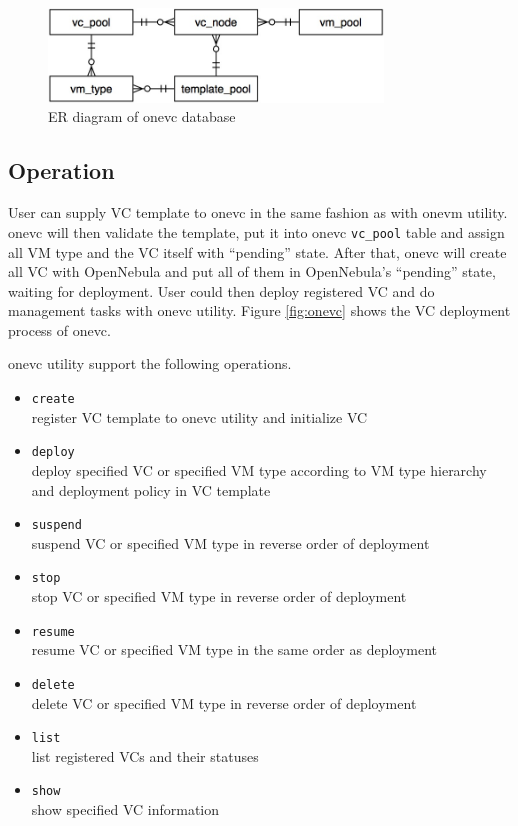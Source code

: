 \documentclass[conference]{IEEEtran}
\begin{document}
\begin{figure}[!t]
\centering
\includegraphics[width=3.5in]{database}
\caption{ER diagram of onevc database}
\label{fig:database}
\end{figure}

\subsection{Operation}
User can supply VC template to onevc in the same fashion as with onevm utility.
onevc will then validate the template, put it into onevc \texttt{vc\_pool} table and assign all VM type and the VC itself with ``pending'' state.
After that, onevc will create all VC with OpenNebula and put all of them in OpenNebula's ``pending'' state, waiting for deployment.
User could then deploy registered VC and do management tasks with onevc utility.
Figure \ref{fig:onevc} shows the VC deployment process of onevc.

onevc utility support the following operations.

\begin{itemize}
\item \texttt{create}\\ register VC template to onevc utility and initialize VC
\item \texttt{deploy}\\ deploy specified VC or specified VM type according to VM type hierarchy and deployment policy in VC template 
\item \texttt{suspend}\\ suspend VC or specified VM type in reverse order of deployment
\item \texttt{stop}\\ stop VC or specified VM type in reverse order of deployment
\item \texttt{resume}\\ resume VC or specified VM type in the same order as deployment
\item \texttt{delete}\\ delete VC or specified VM type in reverse order of deployment
\item \texttt{list}\\ list registered VCs and their statuses
\item \texttt{show}\\ show specified VC information
\end{itemize}
\end{document}
